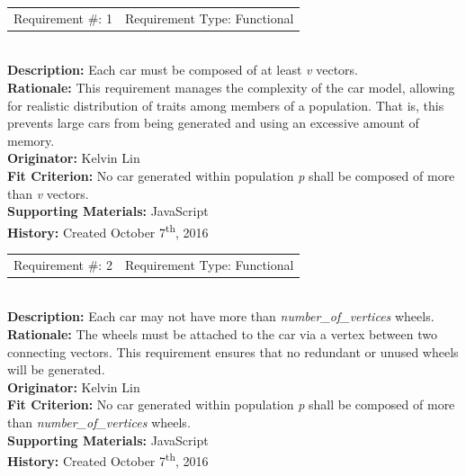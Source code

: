 \documentclass[12pt, titlepage]{article}
\begin{document}
\begin{reqbox}
	\begin{tabular}{cc}
		Requirement \#: 1 & Requirement Type: Functional \\
	\end{tabular} \\
	\textbf{Description:} Each car must be composed of at least \textit{v} vectors. 
	\\
	\textbf{Rationale:}  This requirement manages the complexity of the car model, 
	allowing for realistic distribution of traits among members of a population. 
	That is, this prevents large cars from being generated and using an excessive 
	amount of memory. \\
	\textbf{Originator:} Kelvin Lin\\
	\textbf{Fit Criterion:} No car generated within population \textit{p} shall be 
	composed of more than \textit{v} vectors.\\
	\textbf{Supporting Materials:} JavaScript \\
	\textbf{History:} Created October 7\textsuperscript{th}, 2016
\end{reqbox}

\newpage

\begin{reqbox}
	\begin{tabular}{cc}
		Requirement \#: 2 & Requirement Type: Functional \\
	\end{tabular} \\
	\textbf{Description:} Each car may not have more than 
	\textit{number\_of\_vertices} wheels. \\
	\textbf{Rationale:}  The wheels must be attached to the car via a vertex 
between 
	two connecting vectors. This requirement ensures that no redundant or unused 
	wheels will be generated.\\
	\textbf{Originator:} Kelvin Lin\\
	\textbf{Fit Criterion:} No car generated within population \textit{p} shall be 
	composed of more than \textit{number\_of\_vertices} wheels.\\
	\textbf{Supporting Materials:} JavaScript \\
	\textbf{History:} Created October 7\textsuperscript{th}, 2016
\end{reqbox}
\end{document}
